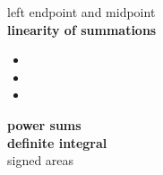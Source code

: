 \documentclass{article}
\begin{document}
left endpoint and midpoint\\

\textbf{linearity of summations}
	\begin{itemize}
		\item
		\item
		\item
	\end{itemize}

\textbf{power sums}\\


\textbf{definite integral}\\


signed areas\\
\end{document}
